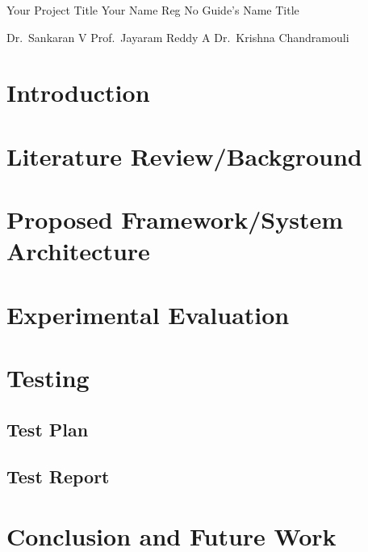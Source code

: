 \documentclass{vitmsprojectreport}
\begin{document}

\maketitlepage%
{Your Project Title}%
{Your Name}%
{Reg No}%
{Guide's Name}%
{Title}%

\makedeclarationpage

\makebonafidepage

\makeackpage%
{Dr.~Sankaran V}%
{Prof.~Jayaram Reddy A}%
{Dr.~Krishna Chandramouli}%


\tableofcontents  %
\clearpage
\listoffigures    %
\clearpage
\listoftables     %
\clearpage

\setcounter{page}{1}


\chapter{Introduction}

\chapter{Literature Review/Background}

\chapter{Proposed Framework/System Architecture}

\chapter{Experimental Evaluation}

\chapter{Testing}

\section{Test Plan}

\section{Test Report}

\chapter{Conclusion and Future Work}

\end{document}
